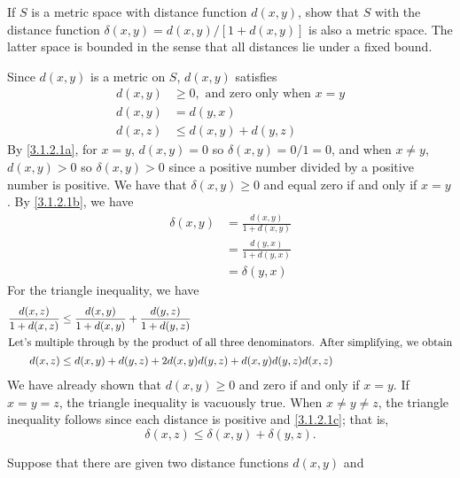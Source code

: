 \begin{exercise}[ref = \arabic{exercisei}]
\item
  \label{3.1.2.1}
  If \(S\) is a metric space with distance function \(d(x,y)\), show that \(S\)
  with the distance function \(\delta(x,y) = d(x,y)/[1 + d(x,y)]\) is also a
  metric space.
  The latter space is bounded in the sense that all distances lie under a fixed
  bound.
  \par\smallskip
  Since \(d(x,y)\) is a metric on \(S\), \(d(x,y)\) satisfies
  \begin{subequations}
    \begin{align}
      d(x, y) & \geq 0,\text{  and zero only when \(x = y\)}\label{3.1.2.1a}\\
      d(x, y) & = d(y, x)\label{3.1.2.1b}\\
      d(x, z) & \leq d(x, y) + d(y, z)\label{3.1.2.1c}
    \end{align}
  \end{subequations}
  By \cref{3.1.2.1a}, for \(x = y\), \(d(x,y) = 0\) so
  \(\delta(x,y) = 0/1 = 0\), and when \(x\neq y\), \(d(x,y) > 0\) so
  \(\delta(x,y) > 0\) since a positive number divided by a positive number is
  positive.
  We have that \(\delta(x,y)\geq 0\) and equal zero if and only if \(x = y\).
  By \cref{3.1.2.1b}, we have
  \begin{align*}
    \delta(x, y) & = \frac{d(x, y)}{1 + d(x, y)}\\
                 & = \frac{d(y, x)}{1 + d(y, x)}\\
                 & = \delta(y, x)
  \end{align*}
  For the triangle inequality, we have
  \begin{align*}
    \frac{d(x, z)}{1 + d(x, z)}
    & \leq \frac{d(x, y)}{1 + d(x, y)} + \frac{d(y, z)}{1 + d(y, z)}\\
    \intertext{Let's multiple through by the product of all three
    denominators.
    After simplifying, we obtain}
    d(x, z) & \leq d(x, y) + d(y,z) + 2d(x, y)d(y, z) + d(x, y)d(y, z)d(x, z)
  \end{align*}
  We have already shown that \(d(x,y)\geq 0\) and zero if and only if
  \(x = y\).
  If \(x = y = z\), the triangle inequality is vacuously true.
  When \(x\neq y\neq z\), the triangle inequality follows since each distance
  is positive and \cref{3.1.2.1c}; that is,
  \[
    \delta(x, z)\leq \delta(x, y) + \delta(y, z).
  \]
\item
  Suppose that there are given two distance functions \(d(x,y)\) and

\end{exercise}
